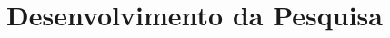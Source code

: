 
\chapter{Desenvolvimento da Pesquisa}
    \label{cha:desenvolvimento-da-pesquisa}
    \markright{}
    
    
    
    